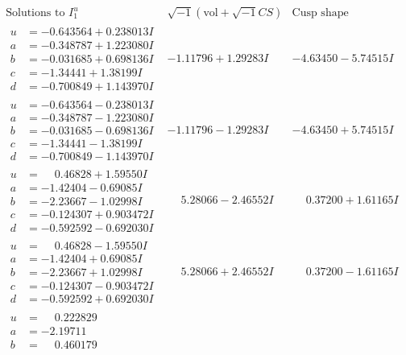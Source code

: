 \documentclass[1p]{elsarticle_modified}
\theoremstyle{definition}
\newcommand{\I}{\sqrt{-1}}
\begin{document}
$$\begin{array}{c|c|c}  
\text{Solutions to }I^u_{1}& \I (\text{vol} + \sqrt{-1}CS) & \text{Cusp shape}\\
 \hline 
\begin{aligned}
u &= -0.643564 + 0.238013 I \\
a &= -0.348787 + 1.223080 I \\
b &= -0.031685 + 0.698136 I \\
c &= -1.34441 + 1.38199 I \\
d &= -0.700849 + 1.143970 I\end{aligned}
 & -1.11796 + 1.29283 I & -4.63450 - 5.74515 I \\ \hline\begin{aligned}
u &= -0.643564 - 0.238013 I \\
a &= -0.348787 - 1.223080 I \\
b &= -0.031685 - 0.698136 I \\
c &= -1.34441 - 1.38199 I \\
d &= -0.700849 - 1.143970 I\end{aligned}
 & -1.11796 - 1.29283 I & -4.63450 + 5.74515 I \\ \hline\begin{aligned}
u &= \phantom{-}0.46828 + 1.59550 I \\
a &= -1.42404 - 0.69085 I \\
b &= -2.23667 - 1.02998 I \\
c &= -0.124307 + 0.903472 I \\
d &= -0.592592 - 0.692030 I\end{aligned}
 & \phantom{-}5.28066 - 2.46552 I & \phantom{-}0.37200 + 1.61165 I \\ \hline\begin{aligned}
u &= \phantom{-}0.46828 - 1.59550 I \\
a &= -1.42404 + 0.69085 I \\
b &= -2.23667 + 1.02998 I \\
c &= -0.124307 - 0.903472 I \\
d &= -0.592592 + 0.692030 I\end{aligned}
 & \phantom{-}5.28066 + 2.46552 I & \phantom{-}0.37200 - 1.61165 I \\ \hline\begin{aligned}
u &= \phantom{-}0.222829\phantom{ +0.000000I} \\
a &= -2.19711\phantom{ +0.000000I} \\
b &= \phantom{-}0.460179\phantom{ +0.000000I} \\

\end{aligned}
\end{array}$$
\end{document}

